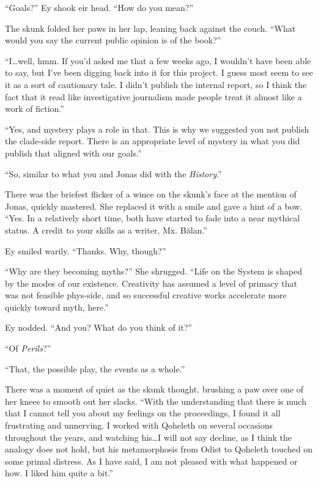 ``Goals?'' Ey shook eir head. ``How do you mean?''

The skunk folded her paws in her lap, leaning back against the couch. ``What would you say the current public opinion is of the book?''

``I\ldots well, hmm. If you'd asked me that a few weeks ago, I wouldn't have been able to say, but I've been digging back into it for this project. I guess most seem to see it as a sort of cautionary tale. I didn't publish the internal report, so I think the fact that it read like investigative journalism made people treat it almost like a work of fiction.''

``Yes, and mystery plays a role in that. This is why we suggested you not publish the clade-side report. There is an appropriate level of mystery in what you did publish that aligned with our goals.''

``So, similar to what you and Jonas did with the \emph{History}.''

There was the briefest flicker of a wince on the skunk's face at the mention of Jonas, quickly mastered. She replaced it with a smile and gave a hint of a bow. ``Yes. In a relatively short time, both have started to fade into a near mythical status. A credit to your skills as a writer, Mx. Bălan.''

Ey smiled warily. ``Thanks. Why, though?''

``Why are they becoming myths?'' She shrugged. ``Life on the System is shaped by the modes of our existence. Creativity has assumed a level of primacy that was not feasible phys-side, and so successful creative works accelerate more quickly toward myth, here.''

Ey nodded. ``And you? What do you think of it?''

``Of \emph{Perils}?''

``That, the possible play, the events as a whole.''

There was a moment of quiet as the skunk thought, brushing a paw over one of her knees to smooth out her slacks. ``With the understanding that there is much that I cannot tell you about my feelings on the proceedings, I found it all frustrating and unnerving. I worked with Qoheleth on several occasions throughout the years, and watching his\ldots I will not say decline, as I think the analogy does not hold, but his metamorphosis from Odist to Qoheleth touched on some primal distress. As I have said, I am not pleased with what happened or how. I liked him quite a bit.''

